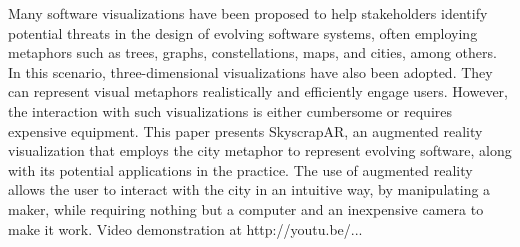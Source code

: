 Many software visualizations have been proposed to help stakeholders identify potential threats in the design of evolving software systems, often employing metaphors such as trees, graphs, constellations, maps, and cities, among others. In this scenario, three-dimensional visualizations have also been adopted. They can represent visual metaphors realistically and efficiently engage users. However, the interaction with such visualizations is either cumbersome or requires expensive equipment. This paper presents SkyscrapAR, an augmented reality visualization that employs the city metaphor to represent evolving software, along with its potential applications in the practice. The use of augmented reality allows the user to interact with the city in an intuitive way, by manipulating a maker, while requiring nothing but a computer and an inexpensive camera to make it work. Video demonstration at http://youtu.be/...